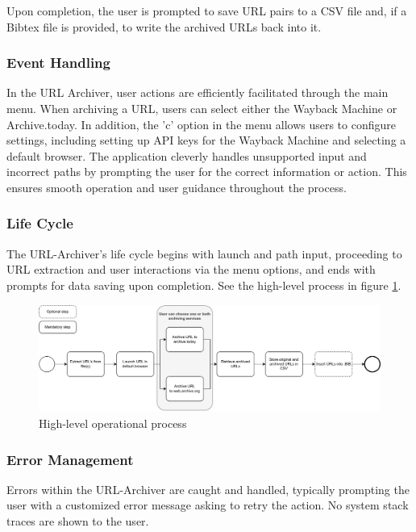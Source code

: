 Upon completion, the user is prompted to save URL pairs to a CSV file and, if a Bibtex file is provided, to write the archived URLs back into it. 


\subsubsection{Event Handling}
In the URL Archiver, user actions are efficiently facilitated through the main menu. When archiving a URL, users can select either the Wayback Machine or Archive.today. In addition, the 'c' option in the menu allows users to configure settings, including setting up API keys for the Wayback Machine and selecting a default browser. The application cleverly handles unsupported input and incorrect paths by prompting the user for the correct information or action. This ensures smooth operation and user guidance throughout the process.

\subsubsection{Life Cycle}
The URL-Archiver’s life cycle begins with launch and path input, proceeding to URL extraction and user interactions via the menu options, and ends with prompts for data saving upon completion. See the high-level process in figure \ref{fig:hl_operational_process}.

\begin{figure}[b]
	\includegraphics[width=1\textwidth]{./diagrams/process_model-simple-horizontal.pdf}
	\centering
	\caption{High-level operational process}
	\label{fig:hl_operational_process}
\end{figure}

\subsubsection{Error Management}
Errors within the URL-Archiver are caught and handled, typically prompting the user with a customized error message asking to retry the action. No system stack traces are shown to the user.

